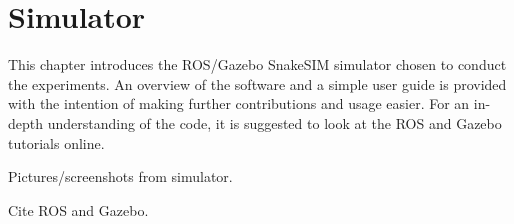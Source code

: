 \chapter{Simulator}\label{chapter:simulator}

This chapter introduces the ROS/Gazebo SnakeSIM simulator \cite{sanfilippo2018snakesim} chosen to conduct the experiments. An overview of the software and a simple user guide is provided with the intention of making further contributions and usage easier. For an in-depth understanding of the code, it is suggested to look at the ROS and Gazebo tutorials online.

Pictures/screenshots from simulator.

Cite ROS and Gazebo.





